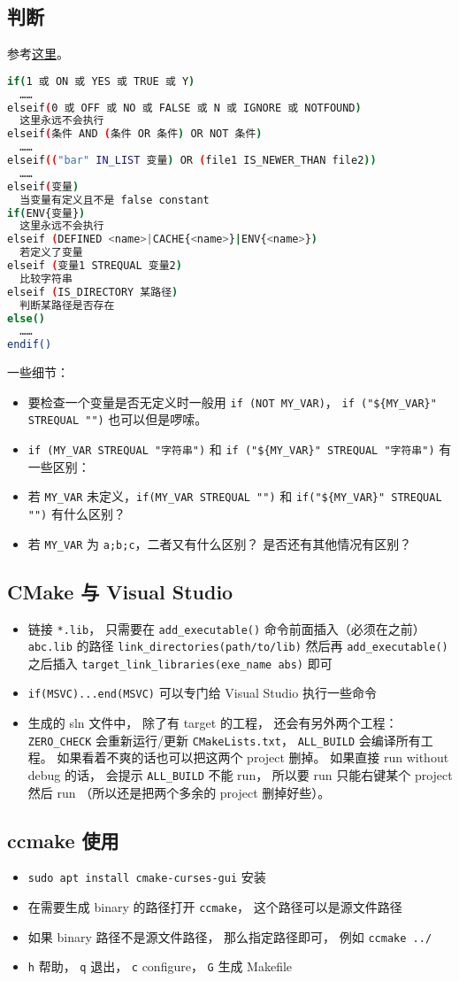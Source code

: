 \subsection{判断}
参考\href{https://cmake.org/cmake/help/latest/command/if.html}{这里}。
\begin{lstlisting}[language=bash]
if(1 或 ON 或 YES 或 TRUE 或 Y)
  ……
elseif(0 或 OFF 或 NO 或 FALSE 或 N 或 IGNORE 或 NOTFOUND)
  这里永远不会执行
elseif(条件 AND (条件 OR 条件) OR NOT 条件)
  ……
elseif(("bar" IN_LIST 变量) OR (file1 IS_NEWER_THAN file2))
  ……
elseif(变量)
  当变量有定义且不是 false constant
if(ENV{变量})
  这里永远不会执行
elseif (DEFINED <name>|CACHE{<name>}|ENV{<name>})
  若定义了变量
elseif (变量1 STREQUAL 变量2)
  比较字符串
elseif (IS_DIRECTORY 某路径)
  判断某路径是否存在
else()
  ……
endif()
\end{lstlisting}
一些细节：
\begin{itemize}
\item 要检查一个变量是否无定义时一般用 \verb`if (NOT MY_VAR)`， \verb`if ("${MY_VAR}" STREQUAL "")` 也可以但是啰嗦。
\item \verb`if (MY_VAR STREQUAL "字符串")` 和 \verb`if ("${MY_VAR}" STREQUAL "字符串")` 有一些区别：
\item 若 \verb`MY_VAR` 未定义，\verb`if(MY_VAR STREQUAL "")` 和 \verb`if("${MY_VAR}" STREQUAL "")` 有什么区别？
\item 若 \verb`MY_VAR` 为 \verb`a;b;c`，二者又有什么区别？ 是否还有其他情况有区别？
\end{itemize}


\subsection{CMake 与 Visual Studio}
\begin{itemize}
\item 链接 \verb`*.lib`， 只需要在 \verb`add_executable()` 命令前面插入（必须在之前） \verb`abc.lib` 的路径 \verb`link_directories(path/to/lib)` 然后再 \verb`add_executable()` 之后插入 \verb`target_link_libraries(exe_name abs)` 即可
\item \verb`if(MSVC)...end(MSVC)` 可以专门给 Visual Studio 执行一些命令
\item 生成的 sln 文件中， 除了有 target 的工程， 还会有另外两个工程： \verb`ZERO_CHECK` 会重新运行/更新 \verb`CMakeLists.txt`， \verb`ALL_BUILD` 会编译所有工程。 如果看着不爽的话也可以把这两个 project 删掉。 如果直接 run without debug 的话， 会提示 \verb`ALL_BUILD` 不能 run， 所以要 run 只能右键某个 project 然后 run （所以还是把两个多余的 project 删掉好些）。
\end{itemize}

\subsection{ccmake 使用}
\begin{itemize}
\item \verb`sudo apt install cmake-curses-gui` 安装
\item 在需要生成 binary 的路径打开 \verb`ccmake`， 这个路径可以是源文件路径
\item 如果 binary 路径不是源文件路径， 那么指定路径即可， 例如 \verb`ccmake ../`
\item \verb`h` 帮助， \verb`q` 退出， \verb`c` configure， \verb`G` 生成 Makefile
\end{itemize}
